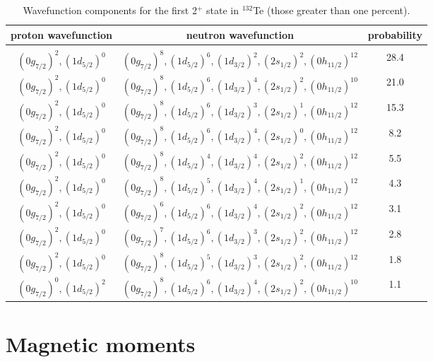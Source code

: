 \documentclass[aps,twocolumn,superscriptaddress,prc,showpacs]{revtex4}
\begin{document}
\begingroup
\begin{table*}
 \caption{\label{tabte134w}
Wavefunction components for the first 2$^+$ state in
$^{132}$Te (those greater than one percent).}
\begin{ruledtabular}
\begin{tabular}{ccc}
proton wavefunction & neutron wavefunction & probability  \\
\hline \\
$  (0g_{7/2})^2,(1d_{5/2})^0  $ &
$  (0g_{7/2})^8,(1d_{5/2})^6,(1d_{3/2})^2,(2s_{1/2})^2,(0h_{11/2})^{12} $ &
28.4 \\
$  (0g_{7/2})^2,(1d_{5/2})^0  $ &
$  (0g_{7/2})^8,(1d_{5/2})^6,(1d_{3/2})^4,(2s_{1/2})^2,(0h_{11/2})^{10} $ &
21.0 \\
$  (0g_{7/2})^2,(1d_{5/2})^0  $ &
$  (0g_{7/2})^8,(1d_{5/2})^6,(1d_{3/2})^3,(2s_{1/2})^1,(0h_{11/2})^{12} $ &
15.3 \\
$  (0g_{7/2})^2,(1d_{5/2})^0  $ &
$  (0g_{7/2})^8,(1d_{5/2})^6,(1d_{3/2})^4,(2s_{1/2})^0,(0h_{11/2})^{12} $ &
8.2 \\
$  (0g_{7/2})^2,(1d_{5/2})^0  $ &
$  (0g_{7/2})^8,(1d_{5/2})^4,(1d_{3/2})^4,(2s_{1/2})^2,(0h_{11/2})^{12} $ &
5.5 \\
$  (0g_{7/2})^2,(1d_{5/2})^0  $ &
$  (0g_{7/2})^8,(1d_{5/2})^5,(1d_{3/2})^4,(2s_{1/2})^1,(0h_{11/2})^{12} $ &
4.3 \\
$  (0g_{7/2})^2,(1d_{5/2})^0  $ &
$  (0g_{7/2})^6,(1d_{5/2})^6,(1d_{3/2})^4,(2s_{1/2})^2,(0h_{11/2})^{12} $ &
3.1 \\
$  (0g_{7/2})^2,(1d_{5/2})^0  $ &
$  (0g_{7/2})^7,(1d_{5/2})^6,(1d_{3/2})^3,(2s_{1/2})^2,(0h_{11/2})^{12} $ &
2.8 \\
$  (0g_{7/2})^2,(1d_{5/2})^0  $ &
$  (0g_{7/2})^8,(1d_{5/2})^5,(1d_{3/2})^3,(2s_{1/2})^2,(0h_{11/2})^{12} $ &
1.8 \\
$  (0g_{7/2})^0,(1d_{5/2})^2  $ &
$  (0g_{7/2})^8,(1d_{5/2})^6,(1d_{3/2})^4,(2s_{1/2})^2,(0h_{11/2})^{10} $ &
1.1 \\
\end{tabular}
\end{ruledtabular}
\end{table*}
\endgroup

\section{Magnetic moments}
\end{document}
